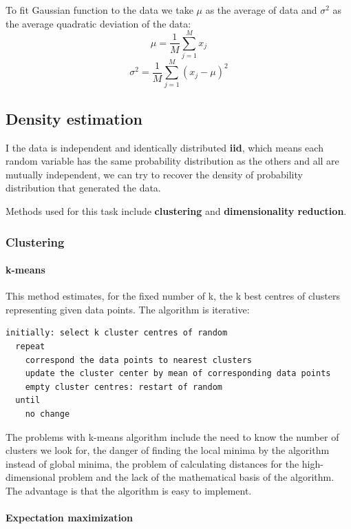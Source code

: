 \documentclass[a4paper,10pt]{article}
\begin{document}
To fit Gaussian function to the data we take $\mu$ as the average of data and $\sigma^2$ as the average quadratic deviation of the data:
\[ \mu = \frac{1}{M} \sum_{j=1}^M x_j \]
\[ \sigma^2 = \frac{1}{M} \sum_{j=1}^M (x_j - \mu)^2 \]

\subsection{Density estimation}

I the data is independent and identically distributed \textbf{iid}, which means each random variable has the same probability distribution as the others and all are mutually independent, we can try to recover the density of probability distribution that generated the data.

Methods used for this task include \textbf{clustering} and \textbf{dimensionality reduction}.

\subsubsection{Clustering}

\paragraph{k-means}

This method estimates, for the fixed number of k, the k best centres of clusters representing given data points. The algorithm is iterative:

\begin{verbatim}
initially: select k cluster centres of random
  repeat
    correspond the data points to nearest clusters
    update the cluster center by mean of corresponding data points
    empty cluster centres: restart of random
  until
    no change
\end{verbatim}

The problems with k-means algorithm include the need to know the number of clusters we look for, the danger of finding the local minima by the algorithm instead of global minima, the problem of calculating distances for the high-dimensional problem and the lack of the mathematical basis of the algorithm. The advantage is that the algorithm is easy to implement.

\paragraph{Expectation maximization}
\end{document}
